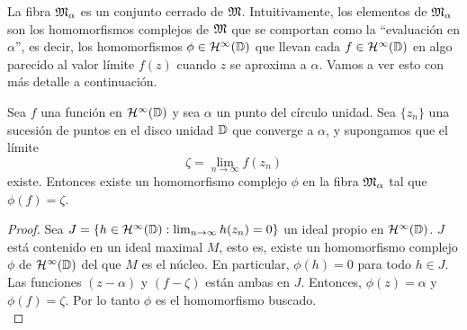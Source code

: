 La fibra $\mathfrak{M}_\alpha$ es un conjunto cerrado de $\mathfrak{M}$. Intuitivamente, los elementos de $\mathfrak{M}_\alpha$ son los homomorfismos complejos de $\mathfrak{M}$ que se comportan como la ``evaluación en $\alpha$'', es decir, los homomorfismos $\phi \in \mathcal{H}^{\infty}(\mathbb{D})$ que llevan cada $f \in \mathcal{H}^{\infty}(\mathbb{D})$ en algo parecido al valor límite $f(z)$ cuando $z$ se aproxima a $\alpha$. Vamos a ver esto con más detalle a continuación. \\

\begin{comment}
Existe una correspondencia uno a uno entre los homomorfismos $\phi: \bholomorphic{\disk} \rightarrow \complex$ y los ideales maximales $M$ en el álgebra $\bholomorphic{\disk}$. Esta correspondencia está definida por $M = \ker (\phi)$. Cada ideal maximal $M$ es cerrado, así que cada homomorfismo $\phi$ es continuo:
\begin{equation*}
    \abs{\phi (x)} \leq \norm{x}.
\end{equation*}
\end{comment}



\begin{theorem}
    \label{result1}
    Sea $f$ una función en $\mathcal{H}^{\infty}(\mathbb{D})$ y sea $\alpha$ un punto del círculo unidad. Sea $\{z_n\}$ una sucesión de puntos en el disco unidad $\mathbb{D}$ que converge a $\alpha$, y supongamos que el límite
    \begin{equation*}
        \zeta = \lim_{n \rightarrow \infty} f(z_n)
    \end{equation*}
    existe. Entonces existe un homomorfismo complejo $\phi$ en la fibra $\mathfrak{M}_\alpha$ tal que $\phi(f) = \zeta$.
\end{theorem}

\begin{proof}
    Sea $J = \{h\in \mathcal{H}^{\infty}(\mathbb{D}) : \lim_{n \rightarrow \infty} h(z_n) = 0 \}$ un ideal propio en $\mathcal{H}^{\infty}(\mathbb{D})$. $J$ está contenido en un ideal maximal $M$, esto es, existe un homomorfismo complejo $\phi$ de  $\mathcal{H}^{\infty}(\mathbb{D})$ del que $M$ es el núcleo. En particular, $\phi(h) = 0$ para todo $h \in J$. Las funciones $(z - \alpha)$ y $(f - \zeta)$ están ambas en $J$. Entonces, $\phi(z) = \alpha$ y $\phi(f) = \zeta$. Por lo tanto $\phi$ es el homomorfismo buscado. \\ %
\end{proof}

